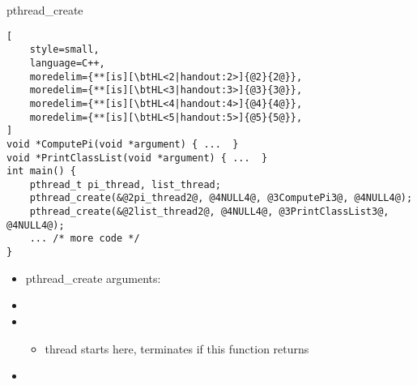 \begin{frame}[fragile,label=pthreadCreateIntro]{pthread\_create}
\begin{lstlisting}[
    style=small,
    language=C++,
    moredelim={**[is][\btHL<2|handout:2>]{@2}{2@}},
    moredelim={**[is][\btHL<3|handout:3>]{@3}{3@}},
    moredelim={**[is][\btHL<4|handout:4>]{@4}{4@}},
    moredelim={**[is][\btHL<5|handout:5>]{@5}{5@}},
]
void *ComputePi(void *argument) { ...  }
void *PrintClassList(void *argument) { ...  }
int main() {
    pthread_t pi_thread, list_thread;
    pthread_create(&@2pi_thread2@, @4NULL4@, @3ComputePi3@, @4NULL4@);
    pthread_create(&@2list_thread2@, @4NULL4@, @3PrintClassList3@, @4NULL4@);
    ... /* more code */
}
\end{lstlisting}
    \begin{itemize}
    \item pthread\_create arguments:
    \item {}
    \item {}
        \begin{itemize}
        \item thread starts here, terminates if this function returns
        \end{itemize}
    \item {}
    \end{itemize}
\end{frame}


